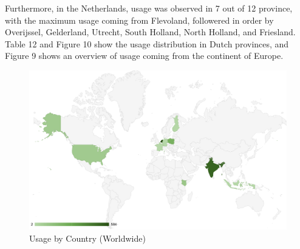 \documentclass{article}
\begin{document}
Furthermore, in the Netherlands, usage was observed in 7 out of 12 province, with the maximum usage coming from Flevoland, followered in order by Overijssel, Gelderland, Utrecht, South Holland, North Holland, and Friesland. Table 12 and Figure 10 show the usage distribution in Dutch provinces, and Figure 9 shows an overview of usage coming from the continent of Europe.

\begin{figure}
  \includegraphics[width=\textwidth]{location-world.png}
  \caption{Usage by Country (Worldwide)}
\end{figure}
\end{document}
